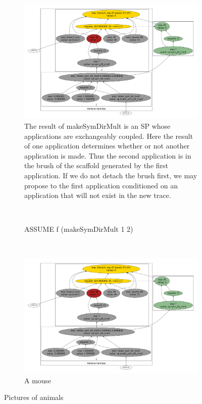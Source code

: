 \documentclass[a4paper,12pt]{article}
\begin{document}
\begin{figure}
        \centering
        \begin{subfigure}[b]{0.3\textwidth}
                \includegraphics[width=\textwidth]{prior/dot3.pdf}
                \caption{
The result of makeSymDirMult is an SP whose applications are exchangeably coupled. Here the result of one application determines whether or not another application is made. Thus the second application is in the brush of the scaffold generated by the first application. If we do not detach the brush first, we may propose to the first application conditioned on  an application that will not exist in the new trace.
}
                \label{fig:gull}
        \end{subfigure}%
        ~ %
        \begin{subfigure}[b]{0.3\textwidth}
                \caption{ASSUME f (makeSymDirMult 1 2)}

                \label{fig:tiger}
        \end{subfigure}
        ~ %
        \begin{subfigure}[b]{0.3\textwidth}
                \includegraphics[width=\textwidth]{prior/dot3.pdf}
                \caption{A mouse}
                \label{fig:mouse}
        \end{subfigure}
        \caption{Pictures of animals}\label{fig:animals}
\end{figure}
\end{document}
